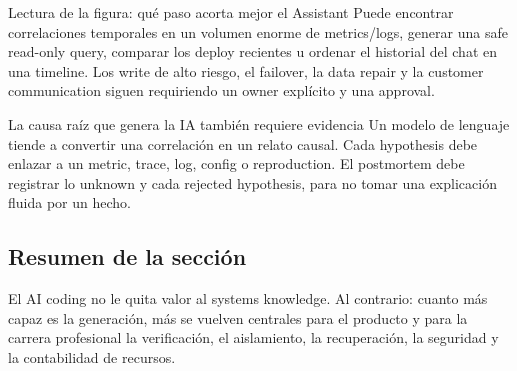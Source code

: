 
\begin{knowledgebox}{Lectura de la figura: qué paso acorta mejor el Assistant}
Puede encontrar correlaciones temporales en un volumen enorme de metrics/logs, generar una safe read-only query, comparar los deploy recientes u ordenar el historial del chat en una timeline. Los write de alto riesgo, el failover, la data repair y la customer communication siguen requiriendo un owner explícito y una approval.
\end{knowledgebox}

\begin{warningbox}{La causa raíz que genera la IA también requiere evidencia}
Un modelo de lenguaje tiende a convertir una correlación en un relato causal. Cada hypothesis debe enlazar a un metric, trace, log, config o reproduction. El postmortem debe registrar lo unknown y cada rejected hypothesis, para no tomar una explicación fluida por un hecho.
\end{warningbox}


\subsection{Resumen de la sección}

El AI coding no le quita valor al systems knowledge. Al contrario: cuanto más capaz es la generación, más se vuelven centrales para el producto y para la carrera profesional la verificación, el aislamiento, la recuperación, la seguridad y la contabilidad de recursos.
